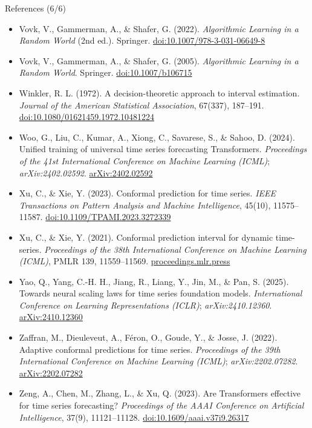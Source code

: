 \begin{frame}{References (6/6)}
\itemsize{\tiny}
\begin{itemize}
    \item Vovk, V., Gammerman, A., \& Shafer, G. (2022). \textit{Algorithmic Learning in a Random World} (2nd ed.). Springer. \href{https://doi.org/10.1007/978-3-031-06649-8}{doi:10.1007/978-3-031-06649-8}
    \item Vovk, V., Gammerman, A., \& Shafer, G. (2005). \textit{Algorithmic Learning in a Random World}. Springer. \href{https://doi.org/10.1007/b106715}{doi:10.1007/b106715}
    \item Winkler, R. L. (1972). A decision-theoretic approach to interval estimation. \textit{Journal of the American Statistical Association}, 67(337), 187--191. \href{https://doi.org/10.1080/01621459.1972.10481224}{doi:10.1080/01621459.1972.10481224}
    \item Woo, G., Liu, C., Kumar, A., Xiong, C., Savarese, S., \& Sahoo, D. (2024). Unified training of universal time series forecasting Transformers. \textit{Proceedings of the 41st International Conference on Machine Learning (ICML)}; \textit{arXiv:2402.02592}. \href{https://arxiv.org/abs/2402.02592}{arXiv:2402.02592}
    \item Xu, C., \& Xie, Y. (2023). Conformal prediction for time series. \textit{IEEE Transactions on Pattern Analysis and Machine Intelligence}, 45(10), 11575--11587. \href{https://doi.org/10.1109/TPAMI.2023.3272339}{doi:10.1109/TPAMI.2023.3272339}
    \item Xu, C., \& Xie, Y. (2021). Conformal prediction interval for dynamic time-series. \textit{Proceedings of the 38th International Conference on Machine Learning (ICML)}, PMLR 139, 11559--11569. \href{https://proceedings.mlr.press/v139/xu21h.html}{proceedings.mlr.press}
    \item Yao, Q., Yang, C.-H. H., Jiang, R., Liang, Y., Jin, M., \& Pan, S. (2025). Towards neural scaling laws for time series foundation models. \textit{International Conference on Learning Representations (ICLR)}; \textit{arXiv:2410.12360}. \href{https://arxiv.org/abs/2410.12360}{arXiv:2410.12360}
    \item Zaffran, M., Dieuleveut, A., Féron, O., Goude, Y., \& Josse, J. (2022). Adaptive conformal predictions for time series. \textit{Proceedings of the 39th International Conference on Machine Learning (ICML)}; \textit{arXiv:2202.07282}. \href{https://arxiv.org/abs/2202.07282}{arXiv:2202.07282}
    \item Zeng, A., Chen, M., Zhang, L., \& Xu, Q. (2023). Are Transformers effective for time series forecasting? \textit{Proceedings of the AAAI Conference on Artificial Intelligence}, 37(9), 11121--11128. \href{https://doi.org/10.1609/aaai.v37i9.26317}{doi:10.1609/aaai.v37i9.26317}

\end{itemize}
\end{frame}
